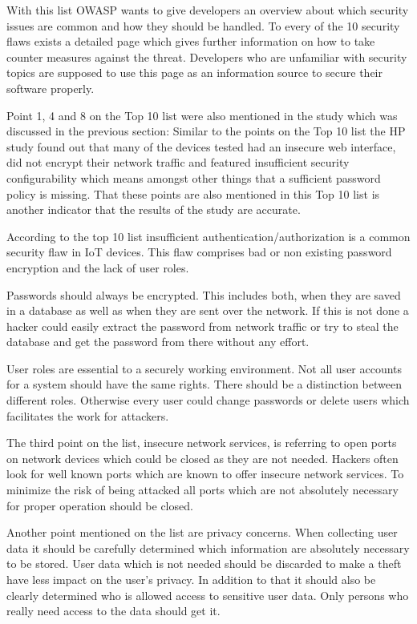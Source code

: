 \documentclass[conference]{IEEEtran}
\begin{document}
With this list OWASP wants to give developers an overview about which security 
issues are common and how they should be handled. To every of the 10 security 
flaws exists a detailed page which gives further information on how to take 
counter measures against the threat. Developers who are unfamiliar with  
security topics are supposed to use this page as an information source to 
secure their software properly.

Point 1, 4 and 8 on the Top 10 list were also mentioned in the study which 
was discussed in the previous section: Similar to the points on the Top 10 list 
the HP study found out that many of the devices tested had an insecure web 
interface, did not encrypt their network traffic and featured insufficient 
security configurability which means amongst other things that a sufficient 
password policy is missing. That these points are also mentioned in this Top 
10 list is another indicator that the results of the study are accurate.

According to the top 10 list insufficient authentication/authorization is a 
common security flaw in IoT devices. This flaw comprises bad or non existing 
password encryption and the lack of user roles. 

Passwords should always be encrypted. This includes both, when they are saved 
in a database as well as when they are sent over the network. If this is not 
done a hacker could easily extract the password from network traffic or try to 
steal the database and get the password from there without any effort. 

User roles are essential to a securely working environment. Not all user 
accounts for a system should have the same rights. There should be a 
distinction between different roles. Otherwise every user could change 
passwords or delete users which facilitates the work for attackers.

The third point on the list, insecure network services, is referring to open 
ports on network devices which could be closed as they are not needed. Hackers 
often look for well known ports which are known to offer insecure network 
services. To minimize the risk of being attacked all ports which are not 
absolutely necessary for proper operation should be closed.

Another point mentioned on the list are privacy concerns. When collecting user 
data it should be carefully determined which information are absolutely 
necessary to be stored. User data which is not needed should be discarded to 
make a theft have less impact on the user's privacy. In addition to that it 
should also be clearly determined who is allowed access to sensitive user data. 
Only persons who really need access to the data should get it.
\end{document}
